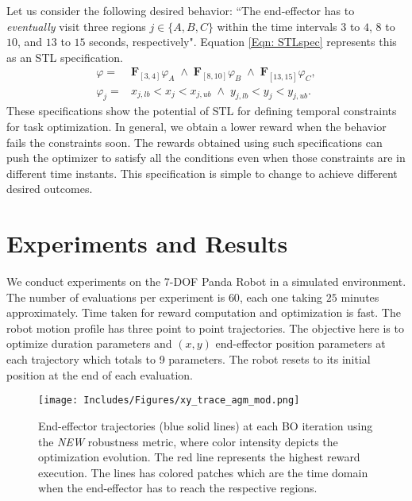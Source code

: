 \documentclass[conference]{IEEEtran}
\begin{document}
Let us consider the following desired behavior: ``The end-effector has to \emph{eventually} visit three regions $j \in \{A, B, C\}$ within the time intervals $3$ to $4$, $8$ to $10$, and $13$ to $15$ seconds, respectively".
Equation \eqref{Eqn: STLspec} represents this as an STL specification.
\begin{equation}
\begin{aligned}
    \varphi =& \mathbf{F}_{[3,4]}\varphi_A \; \land \; \mathbf{F}_{[8,10]}\varphi_B \; \land \; \mathbf{F}_{[13,15]}\varphi_C ,\\
    \varphi_j =& x_{j,lb} < x_j < x_{j,ub} \; \land \; y_{j,lb} < y_j < y_{j,ub} .
\end{aligned}
\label{Eqn: STLspec}
\end{equation}
These specifications show the potential of STL for defining temporal constraints for task optimization.
In general, we obtain a lower reward when the behavior fails the constraints soon.
The rewards obtained using such specifications can push the optimizer to satisfy all the conditions even when those constraints are in different time instants.
This specification is simple to change to achieve different desired outcomes.

\section{Experiments and Results}
We conduct experiments on the 7-DOF Panda Robot in a simulated environment.
The number of evaluations per experiment is $60$, each one taking $25$ minutes approximately.
Time taken for reward computation and optimization is fast.
The robot motion profile has three point to point trajectories. 
The objective here is to optimize duration parameters and $(x,y)$ end-effector position parameters at each trajectory which totals to 9 parameters.
The robot resets to its initial position at the end of each evaluation.

\begin{figure}[t]
    \centering
    \texttt{[image: Includes/Figures/xy\_trace\_agm\_mod.png]}
    \caption{
    End-effector trajectories (blue solid lines) at each BO iteration using the \emph{NEW} robustness metric, where color intensity depicts the optimization evolution.
    The red line represents the highest reward execution. 
    The lines has colored patches which are the time domain when the end-effector has to reach the respective regions.
    }
    \label{fig:XYTrace}
\end{figure}
\end{document}
